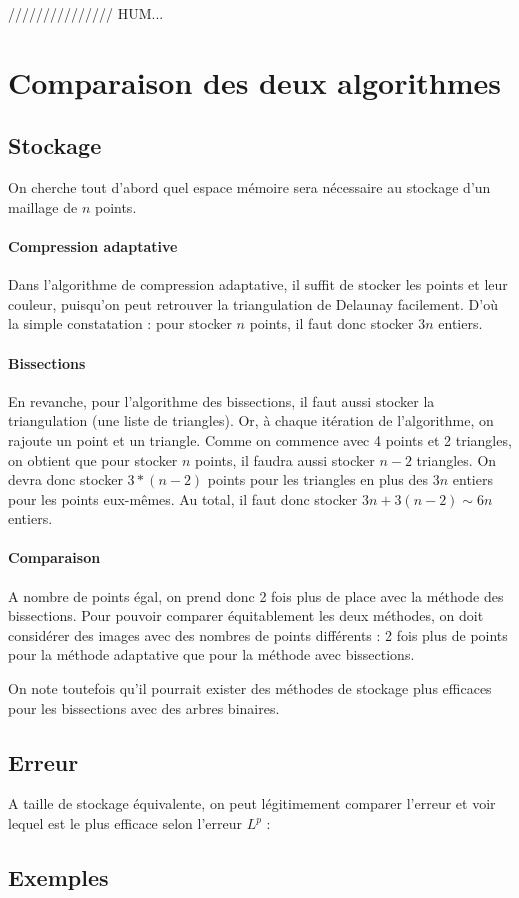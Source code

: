\documentclass{report}
\begin{document}
/////////////// HUM...

\section{Comparaison des deux algorithmes}

\subsection{Stockage}

On cherche tout d'abord quel espace mémoire sera nécessaire au stockage d'un maillage de $n$ points.

\paragraph{Compression adaptative}

Dans l'algorithme de compression adaptative, il suffit de stocker les points et leur couleur, puisqu'on peut retrouver la triangulation de Delaunay facilement. D'où la simple constatation : pour stocker $n$ points, il faut donc stocker $3n$ entiers.

\paragraph{Bissections}

En revanche, pour l'algorithme des bissections, il faut aussi stocker la triangulation (une liste de triangles). Or, à chaque itération de l'algorithme, on rajoute un point et un triangle. Comme on commence avec 4 points et 2 triangles, on obtient que pour stocker $n$ points, il faudra aussi stocker $n-2$ triangles. On devra donc stocker $3*(n-2)$ points pour les triangles en plus des $3n$ entiers pour les points eux-mêmes. Au total, il faut donc stocker $3n + 3(n-2) \sim 6n$ entiers.

\paragraph{Comparaison}

A nombre de points égal, on prend donc 2 fois plus de place avec la méthode des bissections. Pour pouvoir comparer équitablement les deux méthodes, on doit considérer des images avec des nombres de points différents : 2 fois plus de points pour la méthode adaptative que pour la méthode avec bissections.

On note toutefois qu'il pourrait exister des méthodes de stockage plus efficaces pour les bissections avec des arbres binaires.

\subsection{Erreur}

A taille de stockage équivalente, on peut légitimement comparer l'erreur et voir lequel est le plus efficace selon l'erreur $L^p$ :

\subsection{Exemples}
\end{document}

